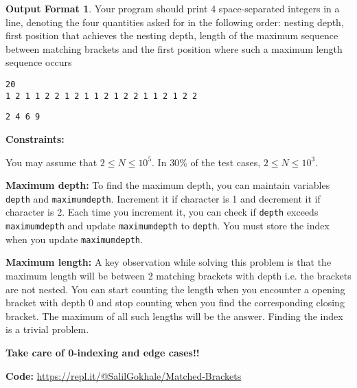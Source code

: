 \documentclass[twoside,12pt,a4paper,english]{book}
\theoremstyle{definition}
\theoremstyle{problemstyle}
\theoremstyle{problemstyle}
\theoremstyle{problemstyle}
\newtheorem*{output_st}{Output Format} %
\begin{document}
\begin{output_st}

Your program should print 4 space-separated integers in a line, denoting the four quantities asked for in the following order: nesting depth, first position that achieves the nesting depth, length of the maximum sequence between matching brackets and the first position where such a maximum length sequence occurs

\end{output_st}

\begin{tcolorbox}[title=Example]
\begin{lstlisting}
20
1 2 1 1 2 2 1 2 1 1 2 1 2 2 1 1 2 1 2 2
\end{lstlisting}
\tcblower
\begin{lstlisting}
2 4 6 9
\end{lstlisting}
\end{tcolorbox}

\textbf{Constraints:}

You may assume that $2 \leq N \leq 10^5$. In $30\%$ of the test cases, $2 \leq N \leq 10^3$. 

\begin{tcolorbox}[title=Solution]

\textbf{Maximum depth:} To find the maximum depth, you can maintain variables \texttt{depth} and \texttt{maximum\textunderscore depth}. Increment it if character is 1 and decrement it if character is 2. Each time you increment it, you can check if \texttt{depth} exceeds \texttt{maximum\textunderscore depth} and update \texttt{maximum\textunderscore depth} to \texttt{depth}. You must store the index when you update \texttt{maximum\textunderscore depth}.

\vspace{5mm}

\textbf{Maximum length:} A key observation while solving this problem is that the maximum length will be between 2 matching brackets with depth  i.e. the brackets are not nested. You can start counting the length when you encounter a opening bracket with depth 0 and stop counting when you find the corresponding closing bracket. The maximum of all such lengths will be the answer. Finding the index is a trivial problem.

\textbf{Take care of 0-indexing and edge cases!!}

\textbf{Code: } \url{https://repl.it/@SalilGokhale/Matched-Brackets}

\end{tcolorbox}
\end{document}
